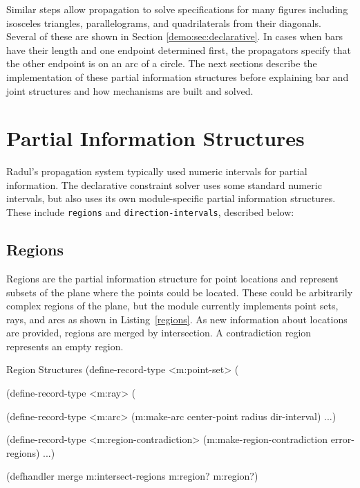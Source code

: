 Similar steps allow propagation to solve specifications for many
figures including isosceles triangles, parallelograms, and
quadrilaterals from their diagonals. Several of these are shown in
Section \ref{demo:sec:declarative}. In cases when bars have their
length and one endpoint determined first, the propagators specify that
the other endpoint is on an arc of a circle. The next sections
describe the implementation of these partial information structures
before explaining bar and joint structures and how mechanisms are
built and solved.

\newpage
\section{Partial Information Structures}

Radul's propagation system typically used numeric intervals for
partial information. The declarative constraint solver uses some
standard numeric intervals, but also uses its own module-specific
partial information structures. These include \texttt{regions} and
\texttt{direction-intervals}, described below:

\subsection{Regions}

Regions are the partial information structure for point locations and
represent subsets of the plane where the points could be
located. These could be arbitrarily complex regions of the plane, but
the module currently implements point sets, rays, and arcs as shown in
Listing~\ref{regions}. As new information about locations are
provided, regions are merged by intersection. A contradiction region
represents an empty region.

\enlargethispage*{\baselineskip}
\begin{code-listing}
[label=regions]
{Region Structures}
(define-record-type <m:point-set>
  (%

(define-record-type <m:ray>
  (%

(define-record-type <m:arc>
  (m:make-arc center-point radius dir-interval) ...)

(define-record-type <m:region-contradiction>
  (m:make-region-contradiction error-regions) ...)

(defhandler merge m:intersect-regions m:region? m:region?)
\end{code-listing}

